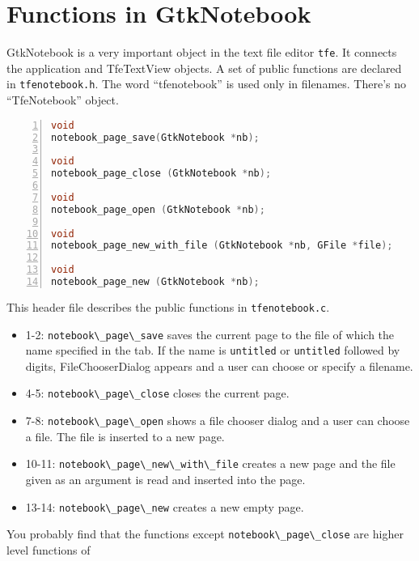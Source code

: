 \hypertarget{functions-in-gtknotebook}{%
\section{Functions in GtkNotebook}\label{functions-in-gtknotebook}}

GtkNotebook is a very important object in the text file editor
\passthrough{\lstinline!tfe!}. It connects the application and
TfeTextView objects. A set of public functions are declared in
\passthrough{\lstinline!tfenotebook.h!}. The word ``tfenotebook'' is
used only in filenames. There's no ``TfeNotebook'' object.

\begin{lstlisting}[language=C, numbers=left]
void
notebook_page_save(GtkNotebook *nb);

void
notebook_page_close (GtkNotebook *nb);

void
notebook_page_open (GtkNotebook *nb);

void
notebook_page_new_with_file (GtkNotebook *nb, GFile *file);

void
notebook_page_new (GtkNotebook *nb);
\end{lstlisting}

This header file describes the public functions in
\passthrough{\lstinline!tfenotebook.c!}.

\begin{itemize}
\tightlist
\item
  1-2: \passthrough{\lstinline!notebook\_page\_save!} saves the current
  page to the file of which the name specified in the tab. If the name
  is \passthrough{\lstinline!untitled!} or
  \passthrough{\lstinline!untitled!} followed by digits,
  FileChooserDialog appears and a user can choose or specify a filename.
\item
  4-5: \passthrough{\lstinline!notebook\_page\_close!} closes the
  current page.
\item
  7-8: \passthrough{\lstinline!notebook\_page\_open!} shows a file
  chooser dialog and a user can choose a file. The file is inserted to a
  new page.
\item
  10-11: \passthrough{\lstinline!notebook\_page\_new\_with\_file!}
  creates a new page and the file given as an argument is read and
  inserted into the page.
\item
  13-14: \passthrough{\lstinline!notebook\_page\_new!} creates a new
  empty page.
\end{itemize}

You probably find that the functions except
\passthrough{\lstinline!notebook\_page\_close!} are higher level
functions of

